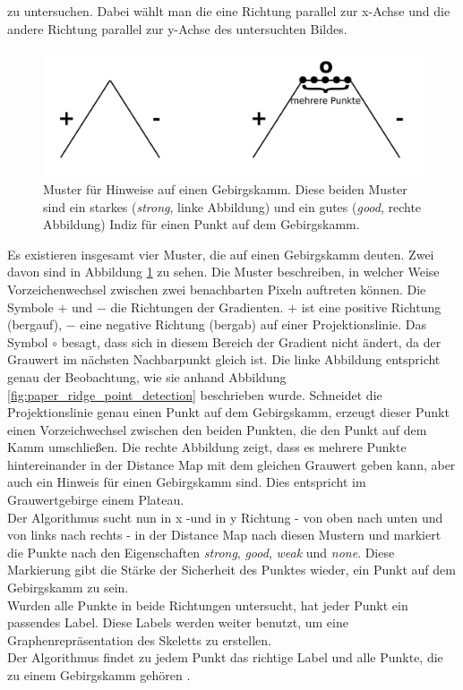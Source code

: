 zu untersuchen. Dabei wählt man die eine Richtung parallel zur x-Achse und die andere Richtung parallel zur y-Achse des untersuchten Bildes.
\begin{figure}
\centering
\includegraphics[width=0.8\linewidth]{./fig/muster_strong_good.pdf}
\caption{Muster für Hinweise auf einen Gebirgskamm. Diese beiden Muster sind ein starkes (\emph{strong}, linke Abbildung) und ein gutes (\emph{good}, rechte Abbildung) Indiz für einen Punkt auf dem Gebirgskamm.}
\label{fig:muster_strong_good}
\end{figure}
Es existieren insgesamt vier Muster, die auf einen Gebirgskamm deuten. Zwei davon sind in Abbildung \ref{fig:muster_strong_good}
zu sehen. Die Muster beschreiben, in welcher Weise Vorzeichenwechsel zwischen zwei benachbarten Pixeln auftreten können. Die Symbole $+$ und $-$ die Richtungen der Gradienten. $+$ ist eine positive Richtung (bergauf), $-$ eine negative Richtung (bergab) auf einer Projektionslinie. Das Symbol $\circ$ besagt, dass sich in diesem Bereich der Gradient nicht ändert, da der Grauwert im nächsten Nachbarpunkt gleich ist. Die linke Abbildung entspricht genau der Beobachtung, wie sie anhand Abbildung
\ref{fig:paper_ridge_point_detection} beschrieben wurde. Schneidet die Projektionslinie genau einen Punkt auf dem Gebirgskamm,
erzeugt dieser Punkt einen Vorzeichwechsel zwischen den beiden Punkten, die den Punkt auf dem Kamm umschließen. Die rechte
Abbildung zeigt, dass es mehrere Punkte hintereinander in der Distance Map mit dem gleichen Grauwert geben kann, aber auch ein
Hinweis für einen Gebirgskamm sind. Dies entspricht im Grauwertgebirge einem Plateau.\\
Der Algorithmus sucht nun in x -und in y Richtung - von oben nach unten und von links nach rechts - in der Distance Map nach diesen Mustern und markiert die Punkte nach den Eigenschaften \emph{strong}, \emph{good}, \emph{weak} und \emph{none}. 
Diese Markierung gibt die Stärke der Sicherheit des Punktes wieder, ein Punkt auf dem Gebirgskamm zu sein. \\
Wurden alle Punkte in beide Richtungen untersucht, hat jeder Punkt ein passendes Label. Diese Labels werden weiter benutzt, um eine Graphenrepräsentation des Skeletts zu erstellen.\\
Der Algorithmus findet zu jedem Punkt das richtige Label und alle Punkte, die zu einem Gebirgskamm gehören \cite{extracting_skeletons_distancemaps}.

